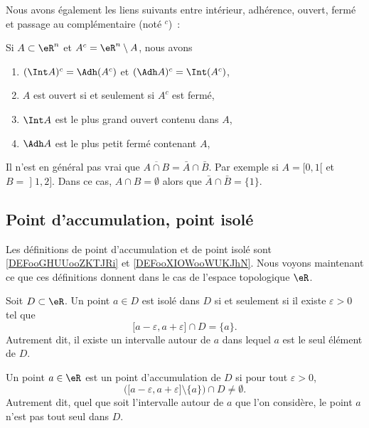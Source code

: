 Nous avons également les liens suivants entre intérieur, adhérence, ouvert, fermé et passage au complémentaire (noté ${}^c$)~:
\begin{proposition}
Si $A \subset \eR^n$ et $A^c = \eR^n\setminus A$, nous
  avons
  \begin{enumerate}
  \item $(\Int A)^c = \Adh (A^c)$ et $(\Adh A)^c = \Int
    (A^c)$,
  \item $A$ est ouvert si et seulement si $A^c$ est fermé,
  \item $\Int A$ est le plus grand ouvert contenu dans $A$,
  \item $\Adh A$ est le plus petit fermé contenant $A$,
  \end{enumerate}
\end{proposition}

\begin{example} \label{ExBFLooUNyvbw}
    Il n'est en général pas vrai que \( \overline{ A\cap B }=\bar A\cap \bar B\). Par exemple si \( A=\mathopen[ 0 , 1 [\) et \( B=\mathopen] 1 , 2 \mathclose]\). Dans ce cas, \( A\cap B=\emptyset\) alors que \( \bar A\cap\bar B=\{ 1 \}\).
\end{example}

\subsection{Point d'accumulation, point isolé}

Les définitions de point d'accumulation et de point isolé sont \ref{DEFooGHUUooZKTJRi} et \ref{DEFooXIOWooWUKJhN}. Nous voyons maintenant ce que ces définitions donnent dans le cas de l'espace topologique \( \eR\).

\begin{lemma}
    Soit $D\subset\eR$. Un point $a\in D$ est isolé dans $D$ si et seulement si il existe $\varepsilon>0$ tel que
    \begin{equation}
        \mathopen[ a-\varepsilon , a+\varepsilon \mathclose]\cap D=\{ a \}.
    \end{equation}
    Autrement dit, il existe un intervalle autour de $a$ dans lequel $a$ est le seul élément de $D$.
\end{lemma}

\begin{lemma}
    Un point $a\in \eR$ est un point d'accumulation de $D$ si pour tout $\varepsilon>0$,
    \begin{equation}
        \Big( \mathopen[ a-\varepsilon , a+\varepsilon \mathclose]\setminus\{ a \} \Big)\cap D\neq\emptyset.
    \end{equation}
    Autrement dit, quel que soit l'intervalle autour de  $a$ que l'on considère, le point $a$ n'est pas tout seul dans $D$.
\end{lemma}

